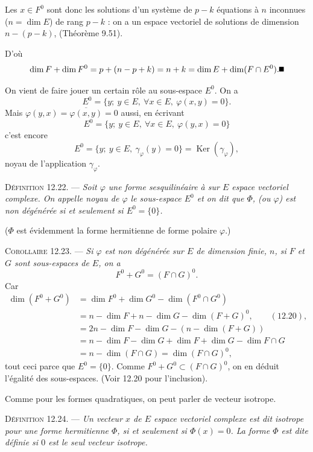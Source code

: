 Les $x\in F^0$ sont donc les solutions d'un système de $p-k$ équations à $n$ inconnues ($n=\dim E$) de rang $p-k$ : on a un espace vectoriel de solutions de dimension $n-(p-k)$, (Théorème 9.51).

D'où
\[
\dim F+\dim F^0=p+(n-p+k)=n+k=\dim E+\dim(F\cap E^0). \bookend
\]

On vient de faire jouer un certain rôle au sous-espace $E^0$. On a
\[
E^0=\{y;\ y\in E,\ \forall x\in E,\ \varphi(x,y)=0\}.
\]
Mais $\varphi(y,x)=\overline{\varphi(x,y)}=0$ aussi, en écrivant
\[
E^0=\{y;\ y\in E,\ \forall x\in E,\ \varphi(y,x)=0\}
\]
c'est encore
\[
E^0=\{y;\ y\in E,\ \gamma_\varphi(y)=0\}=\operatorname{Ker}(\gamma_\varphi),
\]
noyau de l'application  $\gamma_\varphi$.

\medskip\noindent\textsc{Définition 12.22.} --- \emph{Soit $\varphi$ une forme sesquilinéaire à  sur $E$ espace vectoriel complexe. On appelle noyau de $\varphi$ le sous-espace $E^0$ et on dit que $\Phi$, (ou $\varphi$) est non dégénérée si et seulement si $E^0=\{0\}$.}

($\Phi$ est évidemment la forme hermitienne de forme polaire $\varphi$.)

\medskip\noindent\textsc{Corollaire 12.23.} --- \emph{Si $\varphi$ est non dégénérée sur $E$ de dimension finie, $n$, si $F$ et $G$ sont sous-espaces de $E$, on a
\[
F^0+G^0=(F\cap G)^0.
\]}
Car
\begin{align*}
\dim(F^0+G^0)
&=\dim F^0+\dim G^0-\dim(F^0\cap G^0)\\
&=n-\dim F+n-\dim G-\dim(F+G)^0,\qquad (12.20),\\
&=2n-\dim F-\dim G-(n-\dim(F+G))\\
&=n-\dim F-\dim G+\dim F+\dim G-\dim F\cap G\\
&=n-\dim(F\cap G)=\dim(F\cap G)^0,
\end{align*}
tout ceci parce que $E^0=\{0\}$. Comme $F^0+G^0\subset(F\cap G)^0$, on en déduit l'égalité des sous-espaces. (Voir 12.20 pour l'inclusion). \bookend

Comme pour les formes quadratiques, on peut parler de vecteur isotrope.

\medskip\noindent\textsc{Définition 12.24.} --- \emph{Un vecteur $x$ de $E$ espace vectoriel complexe est dit isotrope pour une forme hermitienne $\Phi$, si et seulement si $\Phi(x)=0$. La forme $\Phi$ est dite définie si $0$ est le seul vecteur isotrope.}

